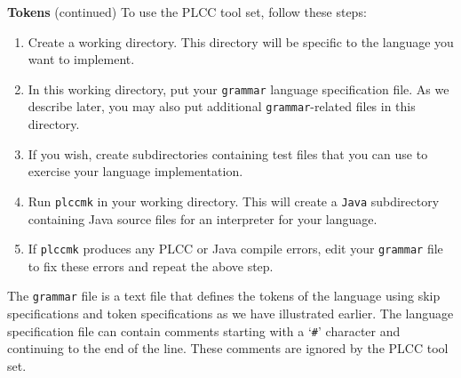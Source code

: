 \begin{minipage}[t]{\sw}
\slidenumber
\LARGE
{\bf Tokens} (continued)\exx
To use the PLCC tool set, follow these steps:
\begin{enumerate}
\itemsep -0.2ex
\item
    Create a working directory.
    This directory will be specific
    to the language you want to implement.
\item
    In this working directory,
    put your \verb'grammar' language specification file.
    As we describe later,
    you may also put additional \verb'grammar'-related files
    in this directory.
\item
    If you wish, create subdirectories containing test files
    that you can use to exercise your language implementation.
\item
    Run \verb'plccmk' in your working directory.
    This will create a \verb'Java' subdirectory
    containing Java source files for an interpreter
    for your language.
\item
    If \verb'plccmk' produces any PLCC or Java compile errors,
    edit your \verb'grammar' file to fix these errors
    and repeat the above step.
\end{enumerate}
The \verb'grammar' file is a text file
that defines the tokens of the language
using skip specifications and token specifications
as we have illustrated earlier.
The language specification file can contain
comments starting with a `\verb'#'' character
and continuing to the end of the line.
These comments are ignored by the PLCC tool set.
\end{minipage}
\clearpage
